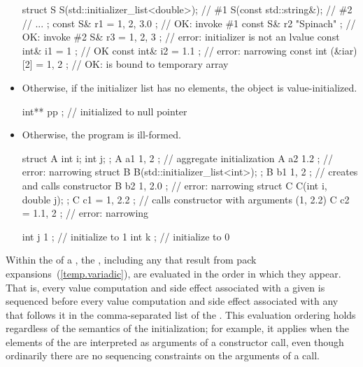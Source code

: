 \begin{itemize}
\enterexample
\begin{codeblock}
struct S {
  S(std::initializer_list<double>); // \#1
  S(const std::string&);            // \#2
  // ...
};
const S& r1 = { 1, 2, 3.0 };        // OK: invoke \#1
const S& r2 { "Spinach" };          // OK: invoke \#2
S& r3 = { 1, 2, 3 };                // error: initializer is not an lvalue
const int& i1 = { 1 };              // OK
const int& i2 = { 1.1 };            // error: narrowing
const int (&iar)[2] = { 1, 2 };     // OK:  is bound to temporary array
\end{codeblock}
\exitexample

\item Otherwise, if the initializer list has no elements, the object is
value-initialized.

\enterexample
\begin{codeblock}
int** pp {};                        // initialized to null pointer
\end{codeblock}
\exitexample

\item Otherwise, the program is ill-formed.

\enterexample
\begin{codeblock}
struct A { int i; int j; };
A a1 { 1, 2 };                      // aggregate initialization 
A a2 { 1.2 };                       // error: narrowing
struct B {
  B(std::initializer_list<int>);
};
B b1 { 1, 2 };                      // creates  and calls constructor
B b2 { 1, 2.0 };                    // error: narrowing
struct C {
  C(int i, double j);
};
C c1 = { 1, 2.2 };                  // calls constructor with arguments (1, 2.2) 
C c2 = { 1.1, 2 };                  // error: narrowing

int j { 1 };                        // initialize to 1
int k { };                          // initialize to 0
\end{codeblock}
\exitexample

\end{itemize}

\pnum
Within the  of a ,
the , including any that result from pack
expansions~(\ref{temp.variadic}), are evaluated in the order in which they
appear. That is, every value computation and side effect associated with a
given  is sequenced before every value
computation and side effect associated with any 
that follows it in the comma-separated list of the .
\enternote This evaluation ordering holds regardless of the semantics of the
initialization; for example, it applies when the elements of the
 are interpreted as arguments of a constructor
call, even though ordinarily there are no sequencing constraints on the
arguments of a call. \exitnote

